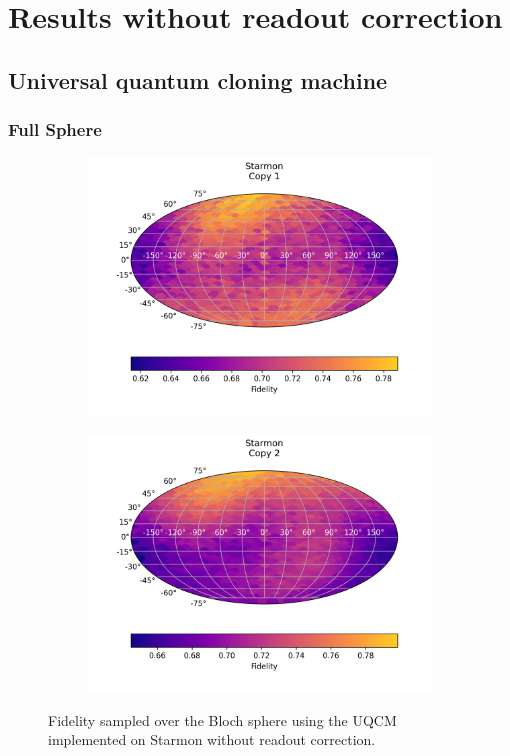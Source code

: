 \chapter{Results without readout correction}
\label{sec:appendix-a}
\section{Universal quantum cloning machine}
\subsection{Full Sphere}
\begin{figure}[H]
    \centering
    \begin{subfigure}{.45\textwidth}
      \centering
      \includegraphics[width=\textwidth]{Figures/UQCM/Starmon/FullSphere/results_starmon_copy1.png}
    \end{subfigure}%
    \begin{subfigure}{.45\textwidth}
      \centering
      \includegraphics[width=\textwidth]{Figures/UQCM/Starmon/FullSphere/results_starmon_copy2.png}
    \end{subfigure}
    \caption{Fidelity sampled over the Bloch sphere using the UQCM implemented on Starmon without readout correction.}
\end{figure}

